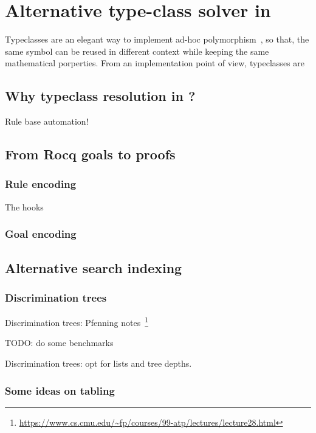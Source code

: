 \chapter{Alternative type-class solver in \coqelpi}

Typeclasses are an elegant way to implement ad-hoc
polymorphism~\cite{wadler1989}, so that, the same symbol can be reused in
different context while keeping the same mathematical porperties. From an
implementation point of view, typeclasses are 

\section{Why typeclass resolution in \elpi?}
\cite{fissore2023}

Rule base automation!

\section{From Rocq goals to \elpi proofs}

\subsection{Rule encoding}

The hooks

\subsection{Goal encoding}

\section{Alternative search indexing}

\subsection{Discrimination trees}

\newcommand{\pfdt}{https://www.cs.cmu.edu/~fp/courses/99-atp/lectures/lecture28.html}

Discrimination trees: Pfenning notes~\footnote{\url{\pfdt}}

TODO: do some benchmarks

Discrimination trees: opt for lists and tree depths.

\subsection{Some ideas on tabling}

